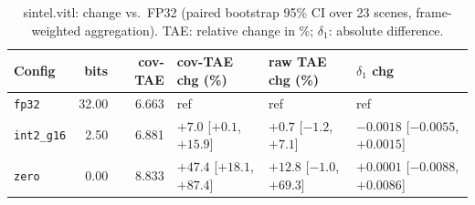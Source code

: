 \begin{table}[t]
\centering
\small
\caption{sintel.vitl: change vs.\ FP32 (paired bootstrap 95\% CI over 23 scenes, frame-weighted aggregation). TAE: relative change in \%; $\delta_1$: absolute difference.}
\label{tab:boot_sintel_vitl_fw}
\begin{tabular}{lrrlll}
\toprule
Config & bits & cov-TAE & cov-TAE chg (\%) & raw TAE chg (\%) & $\delta_1$ chg \\
\midrule
\texttt{fp32} & 32.00 & 6.663 & ref & ref & ref \\
\texttt{int2\_g16} & 2.50 & 6.881 & $+7.0$ [$+0.1$, $+15.9$] & $+0.7$ [$-1.2$, $+7.1$] & $-0.0018$ [$-0.0055$, $+0.0015$] \\
\texttt{zero} & 0.00 & 8.833 & $+47.4$ [$+18.1$, $+87.4$] & $+12.8$ [$-1.0$, $+69.3$] & $+0.0001$ [$-0.0088$, $+0.0086$] \\
\bottomrule
\end{tabular}
\end{table}
